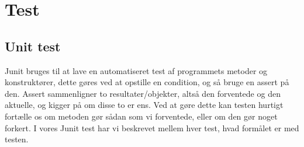 \chapter{Test}

\section{Unit test}
Junit bruges til at lave en automatiseret test af programmets metoder og konstruktører, dette gøres ved at opstille en condition, og så bruge en assert på den. Assert sammenligner to resultater/objekter, altså den forventede og den aktuelle, og kigger på om disse to er ens. Ved at gøre dette kan testen hurtigt fortælle os om metoden gør sådan som vi forventede, eller om den gør noget forkert. I vores Junit test har vi beskrevet mellem hver test, hvad formålet er med testen.

